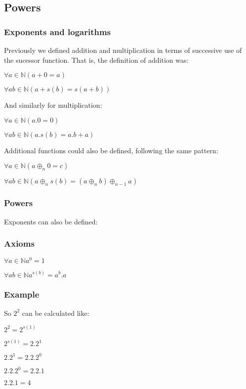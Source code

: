 \subsection{Powers}

\subsubsection{Exponents and logarithms}

Previously we defined addition and multiplication in terms of successive use of the sucessor function. That is, the definition of addition was:

\(\forall a \in \mathbb{N} (a+0=a)\)

\(\forall a b \in \mathbb{N} (a+s(b)=s(a+b))\)

And similarly for multiplication:

\(\forall a \in \mathbb{N} (a.0=0)\)

\(\forall a b \in \mathbb{N} (a.s(b)=a.b+a)\)

Additional functions could also be defined, following the same pattern:

\(\forall a \in \mathbb{N} (a\oplus _n 0=c)\)

\(\forall a b \in \mathbb{N} (a\oplus _{n} s(b)=(a\oplus_{n} b)\oplus_{n-1}a)\)

\subsubsection{Powers}

Exponents can also be defined:

\subsubsection{Axioms}

\(\forall a \in \mathbb{N} a^0=1\)

\(\forall a b \in \mathbb{N} a^{s(b)}=a^b.a\)

\subsubsection{Example}

So \(2^2\) can be calculated like:

\(2^2=2^{s(1)}\)

\(2^{s(1)}=2.2^1\)

\(2.2^1=2.2.2^0\)

\(2.2.2^0=2.2.1\)

\(2.2.1=4\)

